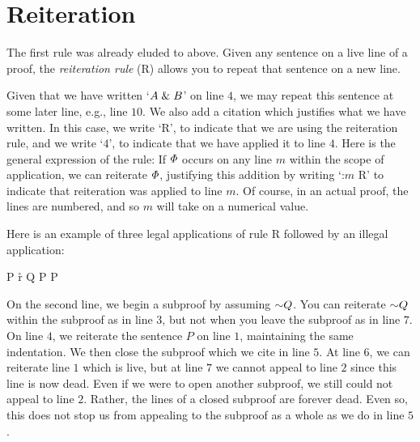 \section{Reiteration}
\label{sec:reiteration}

The first rule was already eluded to above.
Given any sentence on a live line of a proof, the \emph{reiteration rule} (R) allows you to repeat that sentence on a new line.
\begin{fitchproof}
	\have[$\vdots$]{}{\vdots}
	\have[$\vdots$]{}{\vdots}
	 
\end{fitchproof}
Given that we have written `$A \mathrel\& B$' on line $4$, we may repeat this sentence at some later line, e.g., line $10$.
We also add a citation which justifies what we have written.
In this case, we write `R', to indicate that we are using the reiteration rule, and we write `$4$', to indicate that we have applied it to line $4$.
Here is the general expression of the rule:
If $\varPhi$ occurs on any line $m$ within the scope of application, we can reiterate $\varPhi$, justifying this addition by writing `:$m$ R' to indicate that reiteration was applied to line $m$.
Of course, in an actual proof, the lines are numbered, and so $m$ will take on a numerical value.

Here is an example of three legal applications of rule R followed by an illegal application:

\begin{fitchproof}
		 \pr{}
		\open
			 
			 
			 {P} \r{r}
			\close
       {\enot Q \eif P} 
       {P} 
	\end{fitchproof}

On the second line, we begin a subproof by assuming $\enot Q$.
You can reiterate $\enot Q$ within the subproof as in line $3$, but not when you leave the subproof as in line $7$.
On line $4$, we reiterate the sentence $P$ on line $1$, maintaining the same indentation.
We then close the subproof which we cite in line $5$.
At line $6$, we can reiterate line $1$ which is live, but at line $7$ we cannot appeal to line $2$ since this line is now dead.
Even if we were to open another subproof, we still could not appeal to line $2$.
Rather, the lines of a closed subproof are forever dead. 
Even so, this does not stop us from appealing to the subproof as a whole as we do in line $5$.



